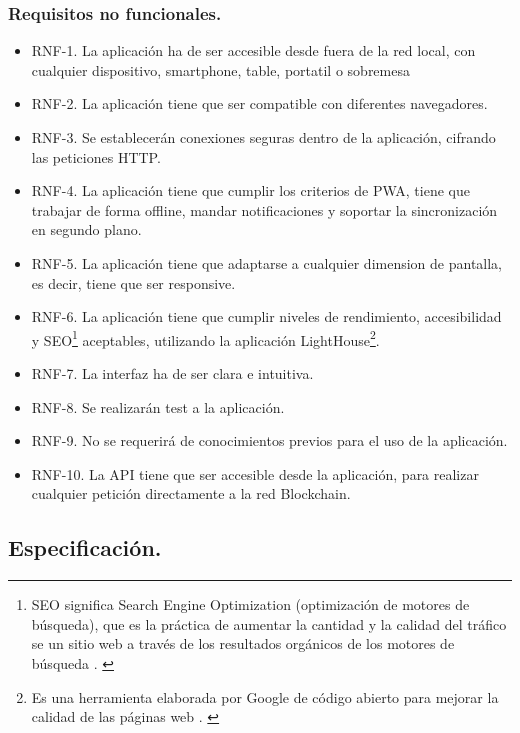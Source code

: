 \subsubsection{Requisitos no funcionales.}

\begin{itemize}
    \item[] RNF-1. La aplicación ha de ser accesible desde fuera de la red local, con cualquier dispositivo, smartphone, 
    table, portatil o sobremesa
    \item[] RNF-2. La aplicación tiene que ser compatible con diferentes navegadores.
    \item[] RNF-3. Se establecerán conexiones seguras dentro de la aplicación, cifrando las peticiones HTTP.
    \item[] RNF-4. La aplicación tiene que cumplir los criterios de PWA, tiene que trabajar de forma offline, mandar
    notificaciones y soportar la sincronización en segundo plano.
    \item[] RNF-5. La aplicación tiene que adaptarse a cualquier dimension de pantalla, es decir, tiene que ser 
    responsive.
    \item[] RNF-6. La aplicación tiene que cumplir niveles de rendimiento, accesibilidad y SEO\footnote{ SEO significa 
    Search Engine Optimization (optimización de motores de búsqueda), que es la práctica de aumentar la cantidad y la 
    calidad del tráfico se un sitio web a través de los resultados orgánicos de los motores de búsqueda 
    \cite{what-is-seo}. 
    \label{fnlabel}} aceptables, utilizando la aplicación LightHouse\footnote{ Es una herramienta elaborada por Google de 
    código abierto para mejorar la calidad de las páginas web \cite{lighthouse}. \label{fnlabel}}.
    \item[] RNF-7. La interfaz ha de ser clara e intuitiva.
    \item[] RNF-8. Se realizarán test a la aplicación.
    \item[] RNF-9. No se requerirá de conocimientos previos para el uso de la aplicación.
    \item[] RNF-10. La API tiene que ser accesible desde la aplicación, para realizar cualquier petición directamente
    a la red Blockchain.
\end{itemize}

\subsection{Especificación.}

